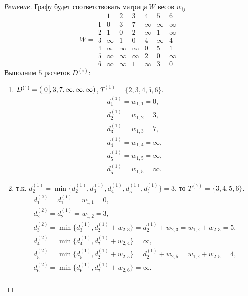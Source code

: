 \begin{proof}[Решение]
    Графу будет соответствовать матрица $W$ весов $w_{ij}$
    \[
        W =
        \begin{array}{c|cccccc}
                &1      &2      &3      &4      &5      &6      \\ \hline
            1   &0      &3      &7      &\infty &\infty &\infty \\
            2   &1      &0      &2      &\infty &1      &\infty \\
            3   &\infty &1      &0      &4      &\infty &4      \\
            4   &\infty &\infty &\infty &0      &5      &1      \\
            5   &\infty &\infty &\infty &2      &0      &\infty \\
            6   &\infty &\infty &1      &\infty &3      &0
        \end{array}
    \]
    Выполним $5$ расчетов $D^{(i)}$:
    \begin{enumerate}
        \item $D^{(1)}=(\fbox{0},3,7,\infty,\infty,\infty)$, $T^{(1)}=\{2,3,4,5,6\}$. 
        \[
            \begin{split}
                d_1^{(1)}=w_{1,1}=0,\\
                d_2^{(1)}=w_{1,2}=3,\\
                d_3^{(1)}=w_{1,3}=7,\\
                d_4^{(1)}=w_{1,4}=\infty,\\
                d_5^{(1)}=w_{1,5}=\infty,\\
                d_5^{(1)}=w_{1,5}=\infty.
            \end{split}
        \]
        
        \item т.к. $d_2^{(1)}=\min\{d_2^{(1)},d_3^{(1)},d_4^{(1)},d_5^{(1)},d_6^{(1)}\}=3$, то $T^{(2)}=\{3,4,5,6\}$.
        \[
            \begin{split}
                d_1^{(2)}=d_1^{(1)}=w_{1,1}=0,\\
                d_2^{(2)}=d_2^{(1)}=w_{1,2}=3,\\
                d_3^{(2)}=\min\{d_3^{(1)}, d_2^{(1)}+w_{2,3}\}=d_2^{(1)}+w_{2,3}=w_{1,2}+w_{2,3}=5,\\
                d_4^{(2)}=\min\{d_4^{(1)}, d_2^{(1)}+w_{2,4}\}=\infty,\\
                d_5^{(2)}=\min\{d_5^{(1)}, d_2^{(1)}+w_{2,5}\}=d_2^{(1)}+w_{2,5}=w_{1,2}+w_{2,5}=4,\\
                d_6^{(2)}=\min\{d_6^{(1)}, d_2^{(1)}+w_{2,6}\}=\infty.\\
            \end{split}
        \]
        

\end{enumerate}
\end{proof}
